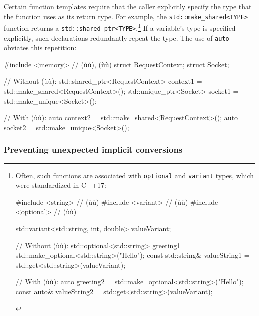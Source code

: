 Certain function templates require that the caller explicitly specify
the type that the function uses as its return type. For example, the
\lstinline!std::make_shared<TYPE>! function returns a
\lstinline!std::shared_ptr<TYPE>!.{\cprotect\footnote{Often, such
functions are associated with \lstinline!optional! and \lstinline!variant!
types, which were standardized in C++17:

\begin{emcppshiddenlisting}[emcppsbatch=e5]
#include <string>    // (ù{}ù)
#include <variant>   // (ù{}ù)
#include <optional>  // (ù{}ù)
\end{emcppshiddenlisting}
\begin{emcppslisting}[emcppsbatch=e5,emcppsstandards={c++17},style=footcode]
std::variant<std::string, int, double> valueVariant;

// Without (ù{}ù):
std::optional<std::string> greeting1 = std::make_optional<std::string>("Hello");
const std::string& valueString1 = std::get<std::string>(valueVariant);

// With (ù{}ù):
auto greeting2 = std::make_optional<std::string>("Hello");
const auto& valueString2 = std::get<std::string>(valueVariant);
\end{emcppslisting}
      }} If a variable's type is specified explicitly, such declarations
redundantly repeat the type. The use of \lstinline!auto! obviates this repetition:

\begin{emcppshiddenlisting}[emcppsbatch=e5]
#include <memory>  // (ù{}ù), (ù{}ù)
struct RequestContext{};
struct Socket{};
\end{emcppshiddenlisting}
\begin{emcppslisting}[emcppsbatch=e5]
// Without (ù{}ù):
std::shared_ptr<RequestContext> context1 = std::make_shared<RequestContext>();
std::unique_ptr<Socket>         socket1  = std::make_unique<Socket>();

// With (ù{}ù):
auto context2 = std::make_shared<RequestContext>();
auto socket2  = std::make_unique<Socket>();
\end{emcppslisting}


\subsubsection[Preventing unexpected implicit conversions]{Preventing unexpected implicit conversions}\label{preventing-unexpected-implicit-conversions}

